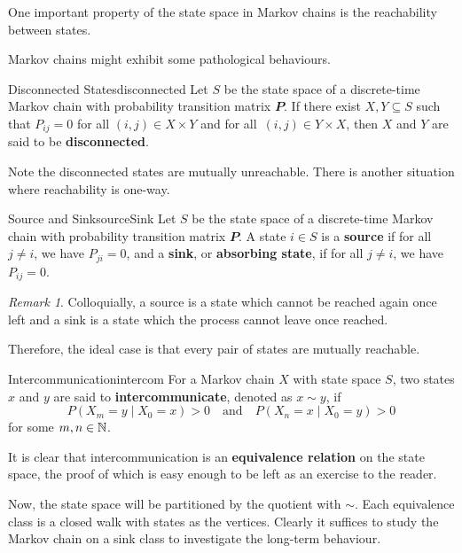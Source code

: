 \documentclass[math, code]{amznotes}
\theoremstyle{remark}
\newtheorem*{remark}{Remark}
\begin{document}
One important property of the state space in Markov chains is the reachability between states.
\begin{dfnbox}{}{}
    
\end{dfnbox}
Markov chains might exhibit some pathological behaviours.
\begin{dfnbox}{Disconnected States}{disconnected}
    Let $S$ be the state space of a discrete-time Markov chain with probability transition matrix $\mathbfit{P}$. If there exist $X, Y \subseteq S$ such that $P_{ij} = 0$ for all $\left(i, j\right) \in X \times Y$ and for all~$\left(i, j\right) \in Y \times X$, then $X$ and $Y$ are said to be {\color{red} \textbf{disconnected}}. 
\end{dfnbox}
Note the disconnected states are mutually unreachable. There is another situation where reachability is one-way.
\begin{dfnbox}{Source and Sink}{sourceSink}
    Let $S$ be the state space of a discrete-time Markov chain with probability transition matrix $\mathbfit{P}$. A state $i \in S$ is a {\color{red} \textbf{source}} if for all $j \neq i$, we have $P_{ji} = 0$, and a {\color{red} \textbf{sink}}, or {\color{red} \textbf{absorbing state}}, if for all $j \neq i$, we have $P_{ij} = 0$.
\end{dfnbox}
\begin{notebox}
    \begin{remark}
        Colloquially, a source is a state which cannot be reached again once left and a sink is a state which the process cannot leave once reached.
    \end{remark}
\end{notebox}
Therefore, the ideal case is that every pair of states are mutually reachable.
\begin{dfnbox}{Intercommunication}{intercom}
    For a Markov chain $X$ with state space $S$, two states $x$ and $y$ are said to {\color{red} \textbf{intercommunicate}}, denoted as $x \sim y$, if 
    \begin{equation*}
        P\left(X_m = y \mid X_0 = x\right) > 0 \quad\textrm{and}\quad P\left(X_n = x \mid X_0 = y\right) > 0
    \end{equation*}
    for some $m, n \in \mathbb{N}$.
\end{dfnbox}
It is clear that intercommunication is an \textbf{equivalence relation} on the state space, the proof of which is easy enough to be left as an exercise to the reader. 

Now, the state space will be partitioned by the quotient with $\sim$. Each equivalence class is a closed walk with states as the vertices. Clearly it suffices to study the Markov chain on a sink class to investigate the long-term behaviour.
\end{document}
